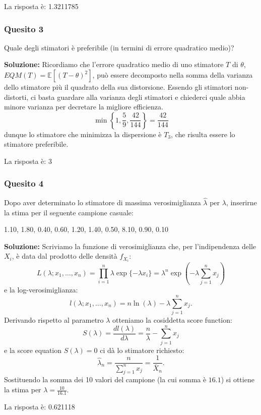 \documentclass[12pt, a4paper]{article}
\begin{document}
La risposta è: 1.3211785

\newpage

\subsubsection*{Quesito 3}
Quale degli stimatori è preferibile (in termini di errore quadratico medio)?

\textbf{Soluzione:}
Ricordiamo che l’errore quadratico medio di uno stimatore $T$ di $\theta$, $EQM(T) = \mathbb{E}[(T-\theta)^2]$, può essere decomposto nella somma della varianza dello stimatore più il quadrato della sua distorsione. Essendo gli stimatori non-distorti, ci basta guardare alla varianza degli stimatori e chiederci quale abbia minore varianza per decretare la migliore efficienza.
$$ \min\left\{1, \frac{5}{9}, \frac{42}{144}\right\} = \frac{42}{144} $$
dunque lo stimatore che minimizza la dispersione è $T_3$, che risulta essere lo stimatore preferibile.

La risposta è: 3

\subsubsection*{Quesito 4}
Dopo aver determinato lo stimatore di massima verosimiglianza $\hat{\lambda}$ per $\lambda$, inserirne la stima per il seguente campione casuale: 
\begin{center}
1.10, 1.80, 0.40, 0.60, 1.20, 1.40, 0.50, 8.10, 0.90, 0.10
\end{center}

\textbf{Soluzione:}
Scriviamo la funzione di verosimiglianza che, per l’indipendenza delle $X_i$, è data dal prodotto delle densità $f_{X_i}$:
$$ L(\lambda; x_1,\dots,x_n) = \prod_{i=1}^n \lambda \exp\{-\lambda x_i\} = \lambda^n \exp\left(-\lambda \sum_{j=1}^n x_j\right) $$
e la log-verosimiglianza:
$$ l(\lambda; x_1,\dots,x_n) = n \ln(\lambda) - \lambda \sum_{j=1}^n x_j. $$
Derivando rispetto al parametro $\lambda$ otteniamo la cosiddetta score function:
$$ S(\lambda) = \frac{d l(\lambda)}{d\lambda} = \frac{n}{\lambda} - \sum_{j=1}^n x_j $$
e la score equation $S(\lambda) = 0$ ci dà lo stimatore richiesto:
$$ \hat{\lambda}_n = \frac{n}{\sum_{j=1}^n x_j} = \frac{1}{\bar{X}_n}. $$
Sostituendo la somma dei 10 valori del campione (la cui somma è $16.1$) si ottiene la stima per $\lambda = \frac{10}{16.1}$.

La risposta è: 0.621118

\newpage
\end{document}
